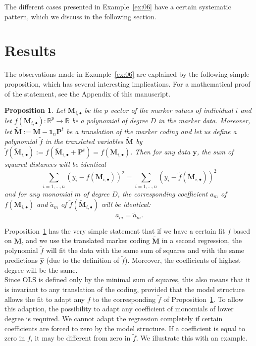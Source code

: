 \documentclass{bmcart}
\newtheorem{proposition}{Proposition}
\newcommand{\M}{\mathbf{M}}
\newcommand{\0}{\mathbf{0}}
\newcommand{\y}{\mathbf{y}}
\renewcommand{\P}{\mathbf{P}}
\begin{document}
The different cases presented in Example~\ref{ex:06} have a certain systematic pattern, which we  discuss in the following section. 


\section*{Results} 
The observations made in Example~\ref{ex:06} are explained by the following simple proposition,
which has several interesting implications. 
For a mathematical proof of the statement, see the Appendix of this manuscript.
\begin{proposition}\label{prop:01} Let $\M_{i,\bullet}$ be the $p$ vector of the marker values of individual $i$ and let $f(\M_{i,\bullet}): \mathbb{R}^p \rightarrow \mathbb{R}$ be a polynomial of degree $D$ in the marker data. Moreover, let $\tilde{\M}:= \M - \mathbf{1}_n \P^t$ be a translation of the marker coding and let us define a polynomial $\tilde{f}$ in the translated variables $\tilde{\M}$ by $\tilde{f}(\tilde{\M}_{i,\bullet}):= f(\tilde{\M}_{i,\bullet} +  \P^t)=f(\M_{i,\bullet})$. Then for any data $\y$, the sum of squared distances will be identical 
	$$ \sum_{i=1,...,n} (y_i - f(\M_{i,\bullet}))^2 = \sum_{i=1,...,n} (y_i - \tilde{f}(\tilde{\M}_{i,\bullet}))^2 $$
	and for any monomial $m$ of degree $D$, the corresponding coefficient $a_m$ of $f(\M_{i,\bullet})$ and $\tilde{a}_m$ of $\tilde{f}(\tilde{\M}_{i,\bullet})$ will be identical:
	$$a_m = \tilde{a}_m.$$ 
\end{proposition}

Proposition~\ref{prop:01} has the very simple statement that if we have a certain fit $f$ based on $\M$, and we use the translated marker coding $\tilde{\M}$ in a second regression, the polynomial $\tilde{f}$ will fit the data with the same sum of squares and with the same predictions $\hat{\y}$ (due to the definition of $\tilde{f}$). Moreover, the coefficients of highest degree will be the same.  \\

Since OLS is defined only by the minimal sum of squares, this also means that it is invariant to any translation of the coding, provided that the model structure allows the fit to 
adapt any $f$ to the corresponding $\tilde{f}$ of Proposition~\ref{prop:01}.
To allow this adaption, the possibility to adapt any coefficient of monomials of lower degree is required.
We cannot adapt the regression completely if certain coefficients are forced to zero by the model structure. If a coefficient is equal to zero in $f$, it may be different from zero in $\tilde{f}$.
We illustrate this with an example. 
\end{document}
